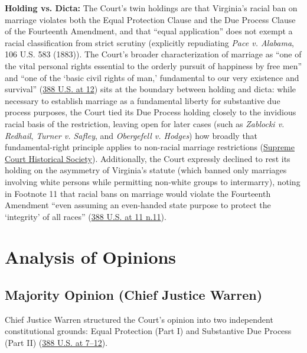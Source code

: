 \documentclass[12pt]{article}
\begin{document}
\textbf{Holding vs. Dicta:} The Court's twin holdings are that Virginia's racial ban on marriage violates both the Equal Protection Clause and the Due Process Clause of the Fourteenth Amendment, and that ``equal application'' does not exempt a racial classification from strict scrutiny (explicitly repudiating \textit{Pace v. Alabama}, 106 U.S. 583 (1883)). The Court's broader characterization of marriage as ``one of the vital personal rights essential to the orderly pursuit of happiness by free men'' and ``one of the `basic civil rights of man,' fundamental to our very existence and survival'' (\href{https://supreme.justia.com/cases/federal/us/388/1/}{388 U.S. at 12}) sits at the boundary between holding and dicta: while necessary to establish marriage as a fundamental liberty for substantive due process purposes, the Court tied its Due Process holding closely to the invidious racial basis of the restriction, leaving open for later cases (such as \textit{Zablocki v. Redhail}, \textit{Turner v. Safley}, and \textit{Obergefell v. Hodges}) how broadly that fundamental-right principle applies to non-racial marriage restrictions (\href{https://civics.supremecourthistory.org/article/loving-v-virginia/}{Supreme Court Historical Society}). Additionally, the Court expressly declined to rest its holding on the asymmetry of Virginia's statute (which banned only marriages involving white persons while permitting non-white groups to intermarry), noting in Footnote 11 that racial bans on marriage would violate the Fourteenth Amendment ``even assuming an even-handed state purpose to protect the `integrity' of all races'' (\href{https://supreme.justia.com/cases/federal/us/388/1/}{388 U.S. at 11 n.11}).

\section{Analysis of Opinions}

\subsection{Majority Opinion (Chief Justice Warren)}
Chief Justice Warren structured the Court's opinion into two independent constitutional grounds: Equal Protection (Part I) and Substantive Due Process (Part II) (\href{https://supreme.justia.com/cases/federal/us/388/1/}{388 U.S. at 7--12}).
\end{document}
